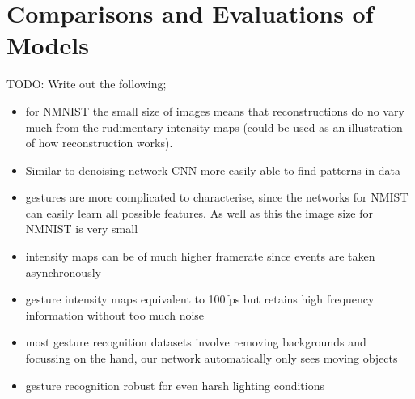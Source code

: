 \section{Comparisons and Evaluations of Models}

\color{red} TODO: Write out the following;

\begin{itemize}
    \item for NMNIST the small size of images means that reconstructions do no vary much from the rudimentary intensity maps (could be used as an illustration of how reconstruction works).
    \item Similar to denoising network CNN more easily able to find patterns in data
    \item gestures are more complicated to characterise, since the networks for NMIST can easily learn all possible features. As well as this the image size for NMNIST is very small
    \item intensity maps can be of much higher framerate since events are taken asynchronously
    \item gesture intensity maps equivalent to 100fps but retains high frequency information without too much noise
    \item most gesture recognition datasets involve removing backgrounds and focussing on the hand, our network automatically only sees moving objects
    \item gesture recognition robust for even harsh lighting conditions
\end{itemize}

\color{black}